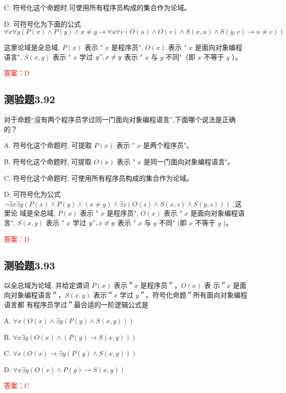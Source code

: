 \documentclass[UTF8, heading=true]{ctexart}
\begin{document}
C. 符号化这个命题时,可使用所有程序员构成的集合作为论域。

D. 
可符号化为下面的公式
$$
\forall x \forall y(P(x) \wedge P(y) \wedge x \neq y \rightarrow \forall u \forall v(O(u) \wedge O(v) \wedge S(x, u) \wedge S(y, v) \rightarrow u \neq v))
$$

这里论域是全总域, $P(x)$ 表示 " $x$ 是程序员", $O(x)$ 表示 " $x$ 是面向对象编程语言", $S(x, y)$ 表示 " $x$ 学过 $y ", x \neq y$ 表示 " $x$ 与 $y$ 不同"（即 $x$ 不等于 $y$ ）。


\textcolor{red}{答案：D}

\subsection{测验题3.92}

对于命题“没有两个程序员学过同一门面向对象编程语言”,下面哪个说法是正确的？

A. 符号化这个命题时, 可提取 $P(x)$ 表示 " $x$ 是两个程序员"。

B. 符号化这个命题时, 可提取 $O(x)$ 表示 " $x$ 是同一门面向对象编程语言"。

C. 符号化这个命题时, 可使用所有程序员构成的集合作为论域。

D. 可符号化为公式 $\neg \exists x \exists y(P(x) \wedge P(y) \wedge(x \neq y) \wedge \exists z(O(z) \wedge S(x, z) \wedge S(y, z)))$ ,这里论
域是全总域, $P(x)$ 表示 " $x$ 是程序员", $O(x)$ 表示 " $x$ 是面向对象编程语言", $S(x, y)$ 表示 " $x$ 学过 $y ", x \neq y$ 表示 " $x$ 与 $y$ 不同" (即 $x$ 不等于 $y$ )。

\textcolor{red}{答案：D}

\subsection{测验题3.93}

以全总域为论域. 并给定谓词 $P(x)$ 表示＂$x$ 是程序员＂，$O(x)$ 表
示＂$x$ 是面向对象编程语言＂，$S(x, y)$ 表示＂$x$ 学过 $y$＂。符号化命题＂所有面向对象编程语言都
有程序员学过＂最合适的一阶逻辑公式是 $\qquad$

A. $\forall x(O(x) \wedge \exists y(P(y) \wedge S(x, y)))$

B. $\forall x \exists y(O(x) \wedge(P(y) \rightarrow S(x, y)))$

C. $\forall x(O(x) \rightarrow \exists y(P(y) \wedge S(x, y)))$

D. $\forall x \exists y(O(x) \wedge P(y) \rightarrow S(x, y))$

\textcolor{red}{答案：C}
\end{document}
